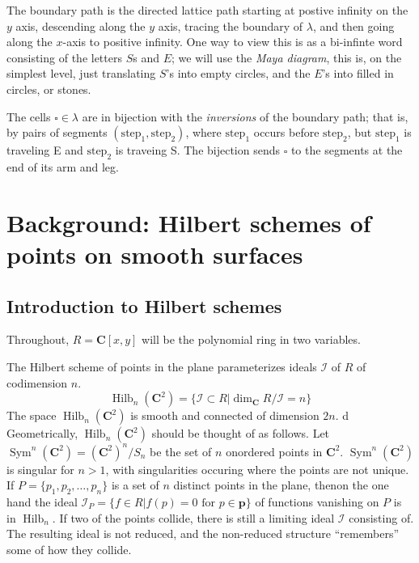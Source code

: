 \documentclass{amsart}[12pt]
\theoremstyle{definition}
\newcommand{\C}{\mathbf{C}}
\DeclareMathOperator{\Hilb}{Hilb}
\DeclareMathOperator{\Sym}{Sym}
\begin{document}
The boundary path is the directed lattice path starting at postive infinity on the $y$ axis, descending along the $y$ axis, tracing the boundary of $\lambda$, and then going along the $x$-axis to positive infinity.  One way to view this is as a bi-infinte word consisting of the letters $S$s and $E$; we will use the \emph{Maya diagram}, this is, on the simplest level, just translating $S$'s into empty circles, and the $E$'s into filled in circles, or stones.  



The cells $\square\in\lambda$ are in bijection with the
\emph{inversions} of the boundary path; that is, by pairs of segments
$(\text{step}_1, \text{step}_2)$, where $\text{step}_1$ occurs before $\text{step}_2$, but $\text{step}_1$ is traveling E and $\text{step}_2$ is traveing S.  The bijection sends $\square$ to the segments at the end of its arm and leg.





\section{Background: Hilbert schemes of points on smooth surfaces}




\subsection{Introduction to Hilbert schemes}

Throughout, $R=\C[x,y]$ will be the polynomial ring in two variables.  

The Hilbert scheme of points in the plane parameterizes ideals $\mathcal{I}$ of $R$ of codimension $n$.
$$\Hilb_n(\C^2)=\{\mathcal{I}\subset R | \dim_\C R/\mathcal{I}=n\}$$
The space $\Hilb_n(\C^2)$ is smooth and connected of dimension $2n$.
d
Geometrically, $\Hilb_n(\C^2)$ should be thought of as follows.  Let $\Sym^n(\C^2)=(\C^2)^n/S_n$ be the set of $n$ onordered points in $\C^2$.  $\Sym^n(\C^2)$ is singular for $n>1$, with singularities occuring where the points are not unique.  
If $P=\{p_1,p_2,\dots, p_n\}$ is a set of $n$ distinct points in the plane, thenon the one hand the ideal $\mathcal{I}_{P}=\{f\in R| f(p)=0 \text{ for }p\in \mathbf{p}\}$ of functions vanishing on $P$ is in $\Hilb_n$.  If two of the points collide, there is still a limiting ideal $\mathcal{I}$ consisting of.  The resulting ideal is not reduced, and the non-reduced structure ``remembers'' some of how they collide.
\end{document}
